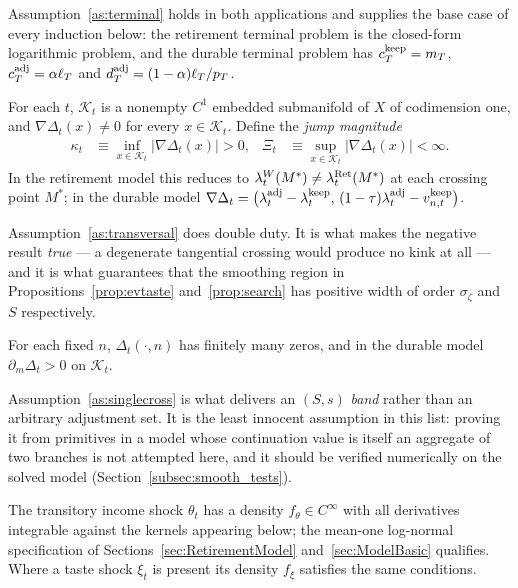 Assumption~\ref{as:terminal} holds in both applications and supplies the base case of
every induction below: the retirement terminal problem is the closed-form logarithmic
problem, and the durable terminal problem has $c_T^{\mathrm{keep}}=m_T$, $c_T^{\mathrm{adj}}=\alpha\ell_T$
and $d_T^{\mathrm{adj}}=(1-\alpha)\ell_T/p_T$.

\begin{assumption}[Transversality]
\label{as:transversal}
For each $t$, $\mathcal{K}_t$ is a nonempty $C^{1}$ embedded submanifold of $X$ of
codimension one, and $\nabla\Delta_t(x)\neq 0$ for every $x\in\mathcal{K}_t$. Define
the \emph{jump magnitude}
\begin{align}
\kappa_t &\equiv \inf_{x\in\mathcal{K}_t}\big|\nabla\Delta_t(x)\big| > 0,
&
\Xi_t &\equiv \sup_{x\in\mathcal{K}_t}\big|\nabla\Delta_t(x)\big| < \infty .
\end{align}
In the retirement model this reduces to $\lambda_t^{W}(M^{\ast})\neq\lambda_t^{\mathrm{Ret}}(M^{\ast})$
at each crossing point $M^{\ast}$; in the durable model
$\nabla\Delta_t=\big(\lambda_t^{\mathrm{adj}}-\lambda_t^{\mathrm{keep}},\,(1-\tau)\lambda_t^{\mathrm{adj}}-v_{n,t}^{\mathrm{keep}}\big)$.
\end{assumption}

Assumption~\ref{as:transversal} does double duty. It is what makes the negative result
\emph{true} --- a degenerate tangential crossing would produce no kink at all --- and
it is what guarantees that the smoothing region in
Propositions~\ref{prop:evtaste} and~\ref{prop:search} has positive width of order
$\sigma_\zeta$ and $S$ respectively.

\begin{assumption}
\label{as:singlecross}
For each fixed $n$, $\Delta_t(\cdot,n)$ has finitely many zeros, and in the durable
model $\partial_m\Delta_t>0$ on $\mathcal{K}_t$.
\end{assumption}

Assumption~\ref{as:singlecross} is what delivers an $(S,s)$ \emph{band} rather than an
arbitrary adjustment set. It is the least innocent assumption in this list: proving it
from primitives in a model whose continuation value is itself an aggregate of two
branches is not attempted here, and it should be verified numerically on the solved
model (Section~\ref{subsec:smooth_tests}).

\begin{assumption}
\label{as:shocks}
The transitory income shock $\theta_{t}$ has a density $f_\theta\in C^{\infty}$ with
all derivatives integrable against the kernels appearing below; the mean-one
log-normal specification of Sections~\ref{sec:RetirementModel}
and~\ref{sec:ModelBasic} qualifies. Where a taste shock $\xi_t$ is present its
density $f_\xi$ satisfies the same conditions.
\end{assumption}

